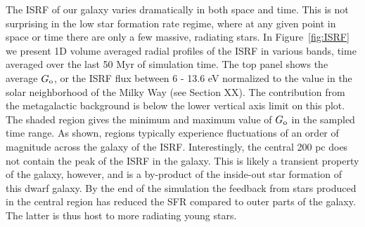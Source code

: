 \documentclass[twocolumn]{aastex61}
\begin{document}
The ISRF of our galaxy varies dramatically in both space and time. This is not surprising in the low star formation rate regime, where at any given point in space or time there are only a few massive, radiating stars. In Figure~\ref{fig:ISRF} we present 1D volume averaged radial profiles of the ISRF in various bands, time averaged over the last 50 Myr of simulation time. The top panel shows the average $G_{\rm o}$, or the ISRF flux between 6 - 13.6 eV normalized to the value in the solar neighborhood of the Milky Way (see Section XX). The contribution from the metagalactic background is below the lower vertical axis limit on this plot. The shaded region gives the minimum and maximum value of $G_{\rm o}$ in the sampled time range. As shown, regions typically experience fluctuations of an order of magnitude across the galaxy of the ISRF. Interestingly, the central 200 pc does not contain the peak of the ISRF in the galaxy. This is likely a transient property of the galaxy, however, and is a by-product of the inside-out star formation of this dwarf galaxy. By the end of the simulation the feedback from stars produced in the central region has reduced the SFR compared to outer parts of the galaxy. The latter is thus host to more radiating young stars.
\end{document}
